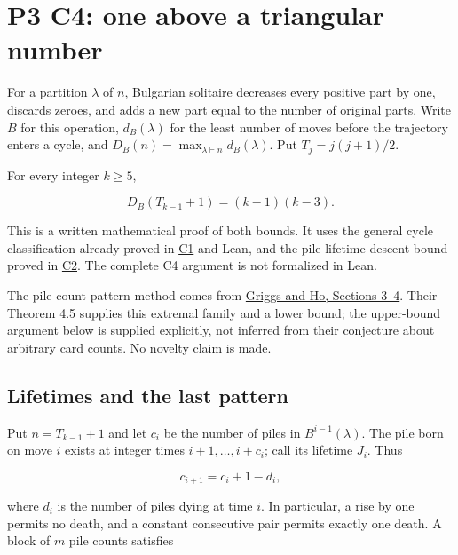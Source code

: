 \documentclass[11pt,a4paper]{article}
\begin{document}
\section{P3 C4: one above a triangular number}\label{p3-c4-one-above-a-triangular-number}

For a partition \(\lambda\) of \(n\), Bulgarian solitaire decreases every positive part by one, discards zeroes, and adds a new part equal to the number of original parts. Write \(B\) for this operation, \(d_B(\lambda)\) for the least number of moves before the trajectory enters a cycle, and \(D_B(n)=\max_{\lambda\vdash n}d_B(\lambda)\). Put \(T_j=j(j+1)/2\).

For every integer \(k\ge5\),

\[
D_B(T_{k-1}+1)=(k-1)(k-3).
\]

This is a written mathematical proof of both bounds. It uses the general cycle classification already proved in \href{https://github.com/mpelteshki/climbing-to-the-frontier/blob/212bba53b1818c08c40b8c4b48f636651eaf6410/cagent/p3/c1/written-proof.md}{C1} and Lean, and the pile-lifetime descent bound proved in \href{https://github.com/mpelteshki/climbing-to-the-frontier/blob/212bba53b1818c08c40b8c4b48f636651eaf6410/cagent/p3/c2/upper-bound-proof.md}{C2}. The complete C4 argument is not formalized in Lean.

The pile-count pattern method comes from \href{https://sc.edu/study/colleges_schools/artsandsciences/mathematics/research/imi/research/documents/1998/1998_12.pdf}{Griggs and Ho, Sections 3--4}. Their Theorem 4.5 supplies this extremal family and a lower bound; the upper-bound argument below is supplied explicitly, not inferred from their conjecture about arbitrary card counts. No novelty claim is made.

\subsection{Lifetimes and the last pattern}\label{lifetimes-and-the-last-pattern}

Put \(n=T_{k-1}+1\) and let \(c_i\) be the number of piles in \(B^{i-1}(\lambda)\). The pile born on move \(i\) exists at integer times \(i+1,\ldots,i+c_i\); call its lifetime \(J_i\). Thus

\[
c_{i+1}=c_i+1-d_i,
\]

where \(d_i\) is the number of piles dying at time \(i\). In particular, a rise by one permits no death, and a constant consecutive pair permits exactly one death. A block of \(m\) pile counts satisfies
\end{document}
